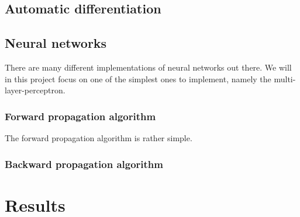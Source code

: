 \documentclass{article}
\begin{document}
\subsection{Automatic differentiation}

\subsection{Neural networks}
There are many different implementations of neural networks out there. We will
in this project focus on one of the simplest ones to implement, namely the
multi-layer-perceptron.

\subsubsection{Forward propagation algorithm}
The forward propagation algorithm is rather simple.

\subsubsection{Backward propagation algorithm}

\section{Results}


\end{document}
